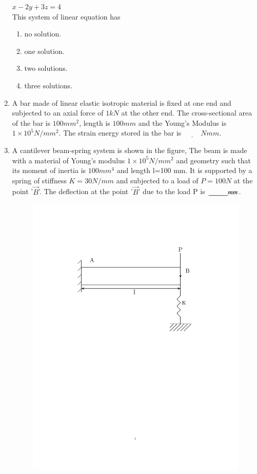\documentclass[journal,12pt,onecolumn,article]{IEEEtran}
\theoremstyle{remark}
\begin{document}
\begin{enumerate}
		$x-2y+3z=4$ \\
		This system of linear equation has
		\begin{enumerate}
			\item no solution.
			\item one solution.
			\item two solutions.
			\item three solutions.
		\end{enumerate}
	\item A bar made of linear elastic isotropic material is fixed at one end and subjected to an axial force of $1 kN$ at the other end. The cross-sectional area of the bar is $100 mm^2$, length is $100 mm$ and the Young's Modulus is $1 \times 10^5 N/mm^2$. The strain energy stored in the bar is $\underline{\hspace{1cm}} Nmm$.
	\item A cantilever beam-spring system is shown in the figure, The beam is made with a material of Young's modulus $1 \times 10^5 N/mm^2$ and geometry such that its moment of inertia is $100 mm^4$ and length l=100 mm. It is supported by a spring of stiffness $K=30 N/mm$ and subjected to a load of $P=100N$ at the point '$\vec{B}$'. The deflection at the point '$\vec{B}$' due to the load P is $\underline{\hspace{1 cm}}mm$.
		\vspace{-66pt}	
		\begin{figure}[H]
	\centering
				\begin{minipage}{0.71\textwidth}
	\includegraphics[width=0.7\linewidth]{fig/fig38/fig38.pdf}

\end{minipage}
\end{figure}
\end{enumerate}
\end{document}
